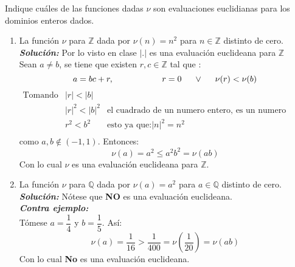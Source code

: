 Indique cuáles de las funciones dadas $\nu$ son evaluaciones euclidianas para los dominios enteros dados.
    \begin{enumerate}
        \item La función $\nu$ para $\mathbb{Z}$ dada por $\nu(n) = n^2$ para $n \in \mathbb{Z}$ distinto de cero.\\
        \textbf{\textit{Soluci\'on:}} Por lo visto en clase $|.|$ es una evaluaci\'on euclideana para $\mathbb{Z}$ \\
        Sean $a\neq b$, se tiene que existen $r,c\in \mathbb{Z}$ tal que :
        $$a=bc + r ,\hspace{2cm}r=0\hspace{0.5cm}\lor\hspace{0.5cm}\nu(r)<\nu(b)$$
        $$
        \begin{array}{cll}
            \text{Tomando} & |r|<|b| &\\
             & |r|^2<|b|^2 & \text{el cuadrado de un numero entero, es un numero entero} \\
             & r^2<b^2 & \text{esto ya que:} |n|^2=n^2 \\
        \end{array}
        $$
        como $a,b\notin(-1,1)$. Entonces: 
        $$\nu(a)=a^2\leq a^2b^2=\nu(ab)$$
        Con lo cual $\nu$ es una evaluaci\'on euclideana para $\mathbb{Z}$.
        \item La función $\nu$ para $\mathbb{Q}$ dada por $\nu(a) = a^2$ para $a \in \mathbb{Q}$ distinto de cero.\\
        \textbf{\textit{Soluci\'on:}}
        Nótese que \textbf{NO} es una evaluaci\'on euclideana. \\
        \textbf{\textit{Contra ejemplo:}}\\
        T\'omese $a=\dfrac{1}{4}$ y $b=\dfrac{1}{5}$. As\'i: 
        $$\nu(a)=\dfrac{1}{16}> \dfrac{1}{400}=\nu\left(\dfrac{1}{20}\right)=\nu(ab)$$
        Con lo cual \textbf{No} es una evaluaci\'on euclideana.
    \end{enumerate}